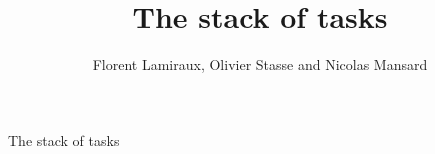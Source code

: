 \documentclass{beamer}
\title[The stack of tasks] {The stack of tasks}
\subtitle{}
\author[]
{Florent Lamiraux, Olivier Stasse and Nicolas Mansard}
\institute[CNRS-LAAS] %
{
  CNRS-LAAS, Toulouse, France
}
\date[] %
{}
\begin{document}
\begin{frame}
  \titlepage
\end{frame}

%
\begin{frame}{The stack of tasks}
\end{frame}

\end{document}
